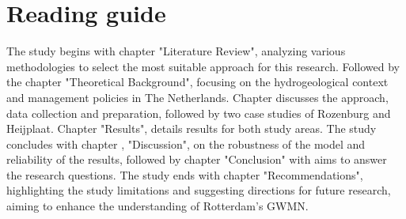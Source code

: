 \section{Reading guide}
The study begins with chapter  "Literature Review", analyzing various methodologies to select the most suitable approach for this research. Followed by the chapter  "Theoretical Background",  focusing on the hydrogeological context and management policies in The Netherlands. Chapter  discusses the approach, data collection and preparation, followed by two case studies of Rozenburg and Heijplaat. Chapter  "Results", details results for both study areas. The study concludes with chapter , "Discussion", on the robustness of the model and reliability of the results, followed by chapter  "Conclusion" with aims to answer the research questions. The study ends with chapter  "Recommendations", highlighting the study limitations and suggesting directions for future research, aiming to enhance the understanding of Rotterdam's GWMN.













